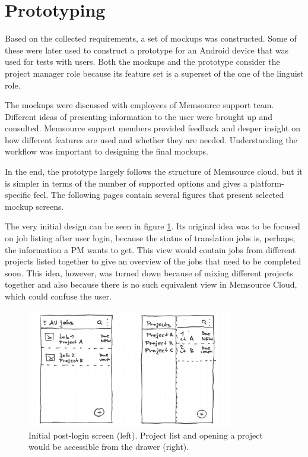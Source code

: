 \section{Prototyping}

Based on the collected requirements, a set of mockups was constructed. Some of these were later used to construct a prototype for an Android device that was used for tests with users. Both the mockups and the prototype consider the project manager role because its feature set is a superset of the one of the linguist role.

The mockups were discussed with employees of Memsource support team. Different ideas of presenting information to the user were brought up and consulted. Memsource support members provided feedback and deeper insight on how different features are used and whether they are needed. Understanding the workflow was important to designing the final mockups.

In the end, the prototype largely follows the structure of Memsource cloud, but it is simpler in terms of the number of supported options and gives a platform-specific feel. The following pages contain several figures that present selected mockup screens.


The very initial design can be seen in figure \ref{mock1}. Its original idea was to be focused on job listing after user login, because the status of translation jobs is, perhaps, the information a PM wants to get. This view would contain jobs from different projects listed together to give an overview of the jobs that need to be completed soon. This idea, however, was turned down because of mixing different projects together and also because there is no such equivalent view in Memsource Cloud, which could confuse the user.

\begin{figure}[H]
	\includegraphics[width=0.8\textwidth]{pics/projects2}
	\caption{Initial post-login screen (left). Project list and opening a project would be accessible from the drawer (right).}
	\label{mock1}
\end{figure}


